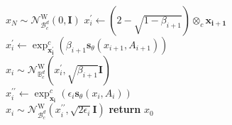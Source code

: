 \documentclass[letterpaper]{article} %
\begin{document}
\begin{algorithm}[t]
\caption{Hyperbolic PC sampling (VP SDE)}
\label{alg:algorithm2}
\begin{algorithmic}[1] %
\STATE $x_N\sim \mathcal{N}_{\mathcal{B}_{c}^{d}}^{\mathrm{W}}(0, \mathbf{I})$
    \STATE $x^\prime_i \gets (2-\sqrt{1-\beta_{i+1}})\otimes_c\boldsymbol{x_{i+1}}$\\
    \STATE $x^\prime_i \gets \exp _{\boldsymbol{x^\prime_i}}^{c}(\beta_{i+1}\boldsymbol{s}_\theta(x_{i+1},A_{i+1}))$\\
    \STATE $x_i\sim \mathcal{N}_{\mathbb{B}_{c}^{d}}^{\mathrm{W}}(x^\prime_i,\sqrt{\beta_{i+1}} \mathbf{I})$\\
        \STATE $x^{\prime\prime}_i \gets  \exp_{\boldsymbol{x_{i}}}^{c}(\epsilon_i\boldsymbol{s}_\theta(x_{i},A_{i}))$ \\
        \STATE $x_i \sim \mathcal{N}_{\mathcal{B}_{c}^{d}}^{\mathrm{W}}(x^{\prime\prime}_i,\sqrt{2\epsilon_i} \mathbf{I}) $
\ENDFOR
\ENDFOR
\STATE \textbf{return} $x_0$
\end{algorithmic}
\end{algorithm}
\end{document}
